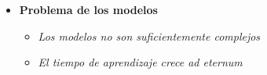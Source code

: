 \documentclass{beamer}
\begin{document}
{\begin{itemize}
	\item \textbf{Problema de los modelos} %
	
	\begin{itemize}
		\item \textit{Los modelos no son suficientemente complejos} %
		
		\item \textit{El tiempo de aprendizaje crece \emph{ad eternum}} %
	\end{itemize}
\end{itemize}


}
\end{document}

